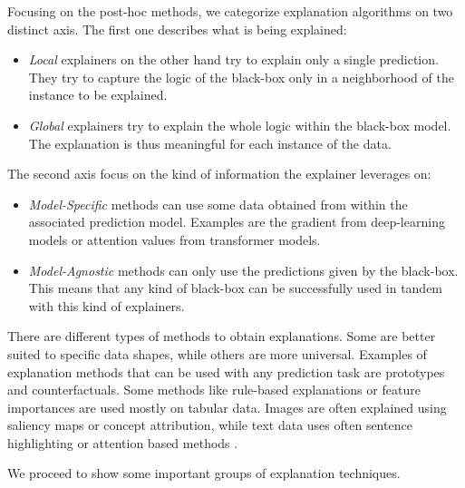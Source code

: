 \documentclass[]{marticle}
\begin{document}
Focusing on the post-hoc methods, we categorize explanation algorithms on two distinct axis. The
first one describes what is being explained:
\begin{itemize}
\item \textit{Local} explainers on the other hand try to explain only a single prediction. They try
    to capture the logic of the black-box only in a neighborhood of the instance to be explained.

\item \textit{Global} explainers try to explain the whole logic within the black-box model. The
    explanation is thus meaningful for each instance of the data.
\end{itemize}

The second axis focus on the kind of information the explainer leverages on:
\begin{itemize}
\item \textit{Model-Specific} methods can use some data obtained from within the associated
    prediction model. Examples are the gradient from deep-learning models or attention values from
    transformer models.

\item \textit{Model-Agnostic} methods can only use the predictions given by the black-box. This
    means that any kind of black-box can be successfully used in tandem with this kind of
    explainers.
\end{itemize}

There are different types of methods to obtain explanations. Some are better suited to specific data
shapes, while others are more universal. Examples of explanation methods that can be used with any
prediction task are prototypes and counterfactuals. Some methods like rule-based explanations or
feature importances are used mostly on tabular data. Images are often explained using saliency maps
or concept attribution, while text data uses often sentence highlighting or attention based methods
\cite{xai-survey}.

We proceed to show some important groups of explanation techniques.
\end{document}
